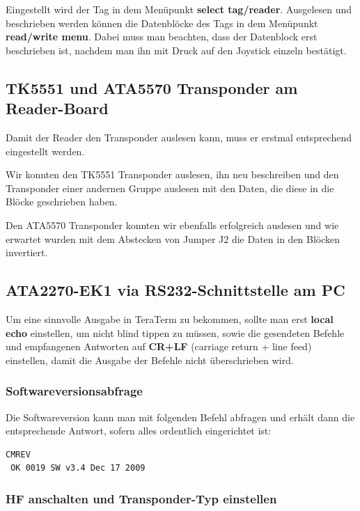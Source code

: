 \documentclass[paper=a4,fontsize=11pt,headsepline,footsepline,parskip=half]{scrartcl}
\begin{document}
Eingestellt wird der Tag in dem Menüpunkt \textbf{select tag/reader}. Ausgelesen und beschrieben werden können die Datenblöcke des Tags
in dem Menüpunkt \textbf{read/write menu}. Dabei muss man beachten, dass der Datenblock erst beschrieben ist, nachdem man ihn mit
Druck auf den Joystick einzeln bestätigt.

\subsection{TK5551 und ATA5570 Transponder am Reader-Board}

Damit der Reader den Transponder auslesen kann, muss er erstmal entsprechend eingestellt werden.

Wir konnten den TK5551 Transponder auslesen, ihn neu beschreiben und den Transponder einer andernen Gruppe auslesen mit den Daten, die
diese in die Blöcke geschrieben haben.

Den ATA5570 Transponder konnten wir ebenfalls erfolgreich auslesen und wie erwartet wurden mit dem Abstecken von Jumper J2 die Daten in den Blöcken invertiert.

\subsection{ATA2270-EK1 via RS232-Schnittstelle am PC}

Um eine sinnvolle Ausgabe in TeraTerm zu bekommen, sollte man erst \textbf{local echo} einstellen, um nicht blind tippen zu müssen,
sowie die gesendeten Befehle und empfangenen Antworten auf \textbf{CR+LF} (carriage return + line feed) einstellen, damit die Ausgabe der
Befehle nicht überschrieben wird.

\subsubsection{Softwareversionsabfrage}

Die Softwareversion kann man mit folgenden Befehl abfragen und erhält dann die entsprechende Antwort, sofern alles ordentlich eingerichtet ist:

\begin{lstlisting}[caption={Softwareversionsabfrage.}]
 CMREV
 OK 0019 SW v3.4 Dec 17 2009
\end{lstlisting}

\subsubsection{HF anschalten und Transponder-Typ einstellen}
\end{document}
